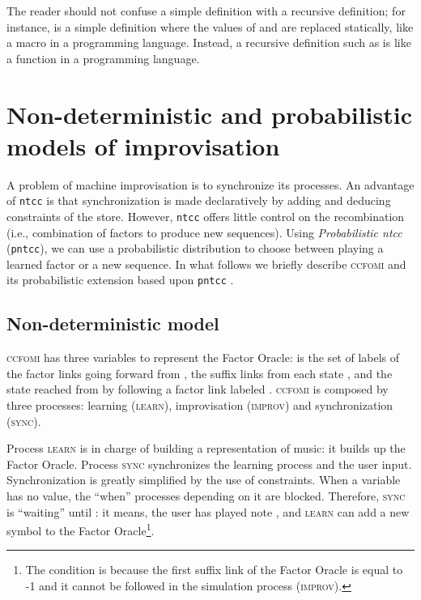 \documentclass[english]{llncs}
\begin{document}
The reader should not confuse a simple definition with a recursive definition; for instance,   is a simple
definition where the values of  and  are replaced statically, like a macro in a programming language.
Instead, a recursive definition such as  
is like 
a function in a programming language.


\section{Non-deterministic and probabilistic models of improvisation}
A problem of machine improvisation is to synchronize its processes. An advantage of \texttt{ntcc} is that synchronization is made declaratively by adding and deducing constraints of the store. However, \texttt{ntcc} offers little control on the recombination (i.e., combination of factors to produce new sequences). Using \textit{Probabilistic ntcc} (\texttt{pntcc}), we can use a probabilistic distribution to choose between playing a learned factor or a new sequence. In what follows we briefly describe \textsc{ccfomi} and its probabilistic extension based upon \texttt{pntcc} \cite{perez09}.



\subsection{Non-deterministic model}
\textsc{ccfomi} has three variables to represent the Factor Oracle:    is the set of labels of the 
factor links going forward from ,  the suffix links
 from each state , and   the state reached from 
 by following a factor link labeled . \textsc{ccfomi} is composed by three processes: learning (\textsc{learn}), improvisation (\textsc{improv}) and synchronization (\textsc{sync}).



Process \textsc{learn} is in charge of building a representation of music: it builds up the Factor Oracle.
Process \textsc{sync} synchronizes the learning process and the user input. 
Synchronization is greatly simplified by the use of constraints. When a variable has no value, the ``when'' processes depending on it are blocked. Therefore,  \textsc{sync} is ``waiting'' until : it means, the user has played note , and \textsc{learn} can add a new symbol to the Factor Oracle\footnote{The condition  is because the first suffix link of the Factor Oracle is equal to -1 and it cannot be followed in the simulation process (\textsc{improv}).}.  \\
\end{document}
